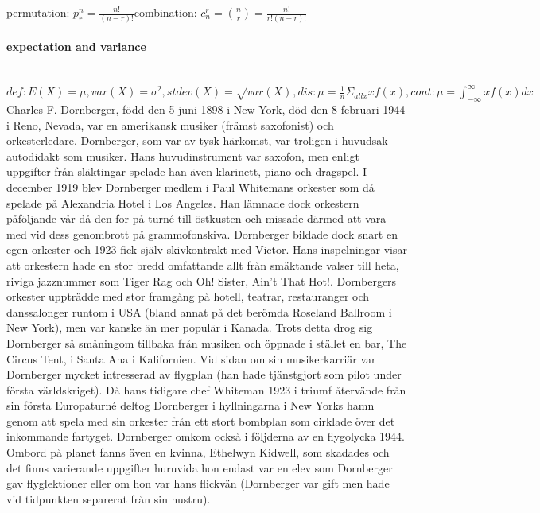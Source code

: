 \documentclass{article}
\begin{document}
\begin{multicols}{3}
permutation: $p_{r}^{n}=\frac{n!}{(n-r)!}$combination: $c_{n}^{r}=\binom{n}{r}=\frac{n!}{r!(n-r)!}$\paragraph{expectation and variance}\mbox{}\\
$def: E(X)=\mu, var(X)=\sigma^{2}, stdev(X)=\sqrt{var(X)}, dis: \mu = \frac{1}{n}\Sigma_{allx} xf(x), cont: \mu = \int_{-\infty}^{\infty} xf(x)dx$
Charles F. Dornberger, född den 5 juni 1898 i New York, död den 8 februari 1944 i Reno, Nevada, var en amerikansk musiker (främst saxofonist) och orkesterledare.
Dornberger, som var av tysk härkomst, var troligen i huvudsak autodidakt som musiker. Hans huvudinstrument var saxofon, men enligt uppgifter från släktingar spelade han även klarinett, piano och dragspel.
I december 1919 blev Dornberger medlem i Paul Whitemans orkester som då spelade på Alexandria Hotel i Los Angeles. Han lämnade dock orkestern påföljande vår då den for på turné till östkusten och missade därmed att vara med vid dess genombrott på grammofonskiva. Dornberger bildade dock snart en egen orkester och 1923 fick själv skivkontrakt med Victor. Hans inspelningar visar att orkestern hade en stor bredd omfattande allt från smäktande valser till heta, riviga jazznummer som Tiger Rag och Oh! Sister, Ain't That Hot!.
Dornbergers orkester uppträdde med stor framgång på hotell, teatrar, restauranger och danssalonger runtom i USA (bland annat på det berömda Roseland Ballroom i New York), men var kanske än mer populär i Kanada. Trots detta drog sig Dornberger så småningom tillbaka från musiken och öppnade i stället en bar, The Circus Tent, i Santa Ana i Kalifornien.
Vid sidan om sin musikerkarriär var Dornberger mycket intresserad av flygplan (han hade tjänstgjort som pilot under första världskriget). Då hans tidigare chef Whiteman 1923 i triumf återvände från sin första Europaturné deltog Dornberger i hyllningarna i New Yorks hamn genom att spela med sin orkester från ett stort bombplan som cirklade över det inkommande fartyget. Dornberger omkom också i följderna av en flygolycka 1944. Ombord på planet fanns även en kvinna, Ethelwyn Kidwell, som skadades och det finns varierande uppgifter huruvida hon endast var en elev som Dornberger gav flyglektioner eller om hon var hans flickvän (Dornberger var gift men hade vid tidpunkten separerat från sin hustru).
\end{multicols}
 
\end{document}
